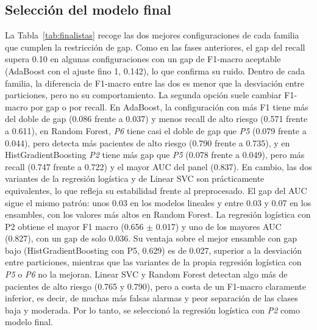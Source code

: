 \documentclass[journal,onecolumn]{IEEEtran}
\begin{document}
\subsection{Selección del modelo final}

La Tabla~\ref{tab:finalistas} recoge las dos mejores configuraciones de cada familia que cumplen la restricción de gap. Como en las fases anteriores, el gap del recall supera 0.10 en algunas configuraciones con un gap de F1-macro aceptable (AdaBoost con el ajuste fino 1, 0.142), lo que confirma su ruido. Dentro de cada familia, la diferencia de F1-macro entre las dos es menor que la desviación entre particiones, pero no su comportamiento. La segunda opción suele cambiar F1-macro por gap o por recall. En AdaBoost, la configuración con más F1 tiene más del doble de gap (0.086 frente a 0.037) y menos recall de alto riesgo (0.571 frente a 0.611), en Random Forest, \textit{P6} tiene casi el doble de gap que \textit{P5} (0.079 frente a 0.044), pero detecta más pacientes de alto riesgo (0.790 frente a 0.735), y en HistGradientBoosting \textit{P2} tiene más gap que \textit{P5} (0.078 frente a 0.049), pero más recall (0.747 frente a 0.722) y el mayor AUC del panel (0.837). En cambio, las dos variantes de la regresión logística y de Linear SVC son prácticamente equivalentes, lo que refleja su estabilidad frente al preprocesado. El gap del AUC sigue el mismo patrón: unos 0.03 en los modelos lineales y entre 0.03 y 0.07 en los ensambles, con los valores más altos en Random Forest. La regresión logística con P2 obtiene el mayor F1 macro (0.656 $\pm$ 0.017) y uno de los mayores AUC (0.827), con un gap de solo 0.036. Su ventaja sobre el mejor ensamble con gap bajo (HistGradientBoosting con P5, 0.629) es de 0.027, superior a la desviación entre particiones, mientras que las variantes de la propia regresión logística con \textit{P5} o \textit{P6} no la mejoran. Linear SVC y Random Forest detectan algo más de pacientes de alto riesgo (0.765 y 0.790), pero a costa de un F1-macro claramente inferior, es decir, de muchas más falsas alarmas y peor separación de las clases baja y moderada. Por lo tanto, se seleccionó la regresión logística con \textit{P2} como modelo final.
\end{document}
